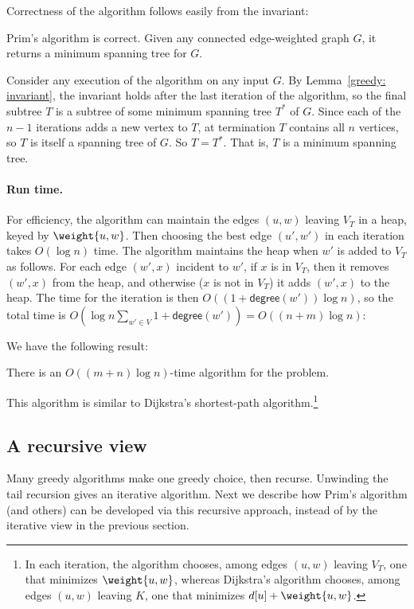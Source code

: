 Correctness of the algorithm follows easily from the invariant:

\begin{theorem}
  Prim's algorithm is correct.
  Given any connected edge-weighted graph $G$,
  it returns a minimum spanning tree for $G$.
\end{theorem}
\begin{shortFormProof}
  Consider any execution of the algorithm on any input $G$.
  By Lemma~\ref{greedy: invariant}, the invariant holds after the last
  iteration of the algorithm, so the final subtree $T$
  is a subtree of some minimum spanning tree $T^*$ of $G$.
  Since each of the $n-1$ iterations adds a new vertex to $T$,
  at termination $T$ contains all $n$ vertices,
  so $T$ is itself a spanning tree of $G$.
  So $T=T^*$.  That is, $T$ is a minimum spanning tree.
\end{shortFormProof}


\paragraph{Run time.}
For efficiency, %
the algorithm can maintain the edges $(u,w)$ leaving $V_T$ in a heap,
keyed by $\weight {u, w}$.
Then choosing the best edge $(u', w')$ in each iteration takes $O(\log n)$ time.
The algorithm maintains the heap when $w'$ is added to $V_T$ as follows.
For each edge $(w', x)$ incident to $w'$,
if $x$ is in $V_T$, then it removes $(w', x)$ from the heap,
and otherwise ($x$ is not in $V_T$) it adds $(w', x)$ to the heap.
The time for the iteration is then $O((1+\textsf{degree}(w')) \log n)$,
so the total time is $O(\log n \sum_{w'\in V} 1 + \textsf{degree}(w')) = O((n+m)\log n)$:

We have the following result:
\begin{theorem}
  There is an $O((m+n)\log n)$-time algorithm for the  problem.
\end{theorem}

This algorithm is similar to Dijkstra's shortest-path algorithm.\footnote
{In each iteration,
the algorithm chooses, among edges $(u, w)$ leaving $V_T$, one that minimizes $\weight {u, w}$,
whereas Dijkstra's algorithm chooses,
among edges $(u, w)$ leaving $K$, one that minimizes $d[u] + \weight {u, w}$.}


\subsection{A recursive view}
Many greedy algorithms make one greedy choice, then recurse.
Unwinding the tail recursion gives an iterative algorithm.
Next we describe how Prim's algorithm (and others)
can be developed via this recursive approach,
instead of by the iterative view in the previous section.

